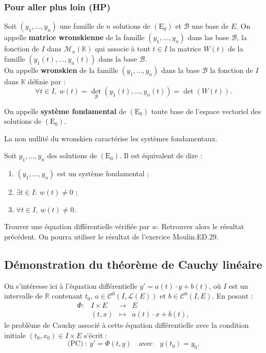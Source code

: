 \documentclass[french]{article}
\newcommand{\R}{\mathbb{R}}
\newcommand{\K}{\mathbb{K}}
\theoremstyle{plain}
\theoremstyle{definition}
\theoremstyle{remark}
\begin{document}
\subsubsection*{Pour aller plus loin (HP)}

\begin{dfn}
	Soit $(y_1,\ldots,y_n)$ une famille de $n$ solutions de $(\text{E}_0)$ et $\mathcal{B}$ une base de $E$. On appelle \textbf{matrice wronskienne} de la famille $(y_1,\ldots,y_n)$ dans las base $\mathcal{B}$, la fonction de $I$ dans $\mathcal{M}_n(\K)$ qui associe à tout $t\in I$ la matrice $W(t)$ de la famille $(y_1(t),\ldots,y_n(t))$ dans la base $\mathcal{B}$.\\
	On appelle \textbf{wronskien} de la famille $(y_1,\ldots,y_n)$ dans la base $\mathcal{B}$ la fonction de $I$ dans $\K$ définie par :
	$$\forall t\in I,\ w(t)=\det_{\mathcal{B}}(y_1(t),\ldots,y_n(t))=\det(W(t)).$$
\end{dfn}

\begin{dfn}
	On appelle \textbf{système fondamental} de $(\text{E}_0)$ toute base de l'espace vectoriel des solutions de $(\text{E}_0)$.
\end{dfn}

La non nullité du wronskien caractérise les systèmes fondamentaux.

\begin{prop}%
	Soit $y_1,\ldots,y_n$ des solutions de $(\text{E}_0)$. Il est équivalent de dire :
	\begin{enumerate}[label=(\roman*)]
		\item $(y_1,\ldots,y_n)$ est un système fondamental ;
		\item $\exists t\in I :\ w(t)\ne 0$ ;
		\item $\forall t\in I,\ w(t)\ne 0$. 
	\end{enumerate}
\end{prop}

\begin{exo}
	Trouver une équation différentielle vérifiée par $w$. Retrouver alors le résultat précédent. On pourra utiliser le résultat de l'exercice Moulin.ED.29.
\end{exo}

\subsection{Démonstration du théorème de Cauchy linéaire}

On s'intéresse ici à l'équation différentielle $y'=a(t)\cdot y+b(t)$, où $I$ est un intervalle de $\R$ contenant $t_0$, $a\in\mathcal{C}^0(I,\mathcal{L}(E))$ et $b\in\mathcal{C}^0(I,E)$. En posant :
$$\begin{array}{lrcl}
	\Phi:&I\times E&\longrightarrow& E\\
	&(t,x)&\longmapsto&a(t)\cdot x+b(t),
\end{array}$$ le problème de Cauchy associé à cette équation différentielle avec la condition initiale $(t_0,x_0)\in I\times E$ s'écrit :
$$\text{(PC)}\ :\ y'=\Phi(t,y)\quad\text{avec}\quad y(t_0)=y_0.$$
\end{document}
